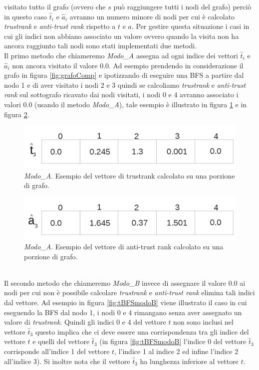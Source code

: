 visitato tutto il grafo (ovvero che \(s\) può raggiungere tutti i nodi del grafo) perciò in questo caso \(\hat{t}_i\) e \(\hat{a}_i\) avranno un numero minore di nodi per cui è calcolato \textit{trustrank} e \textit{anti-trust rank} rispetto a \(t\) e \(a\). Per gestire questa situazione i casi in cui gli indici non abbiano associato un valore ovvero quando la visita non ha ancora raggiunto tali nodi sono stati implementati due metodi.\\ 
Il primo metodo che chiameremo \textit{Modo\_A} assegna ad ogni indice dei vettori \(\hat{t}_i\) e \(\hat{a}_i\) non ancora visitato il valore 0.0. Ad esempio prendendo in considerazione il grafo in figura \ref{fig:grafoComp} e ipotizzando di eseguire una BFS a partire dal nodo 1 e di aver visitato i nodi 2 e 3 quindi se calcoliamo \textit{trustrank} e \textit{anti-trust rank} sul sottografo ricavato dai nodi visitati, i nodi 0 e 4 avranno associato i valori 0.0 (usando il metodo \textit{Modo\_A}), tale esempio è illustrato in figura \ref{fig:tBFSmodoA} e in figura \ref{fig:aBFSmodoA}.
\begin{figure}
\centering
 \includegraphics{immagini/test/tBFSmodoA}
 \caption{\textit{Modo\_A}. Esempio del vettore di trustrank calcolato su una porzione di grafo.}
 \label{fig:tBFSmodoA}
\end{figure}
\begin{figure}
\centering
 \includegraphics{immagini/test/aBFSmodoA}
 \caption{\textit{Modo\_A}. Esempio del vettore di anti-trust rank calcolato su una porzione di grafo.}
 \label{fig:aBFSmodoA}
\end{figure}
\\
Il secondo metodo che chiameremo \textit{Modo\_B} invece di assegnare il valore 0.0 ai nodi per cui non è possibile calcolare \textit{trustrank} e \textit{anti-trust rank} elimina tali indici dal vettore.  Ad esempio in figura \ref{fig:tBFSmodoB} viene illustrato il caso in cui eseguendo la BFS dal nodo 1, i nodi 0 e 4 rimangano senza aver assegnato un valore di \textit{trustrank}. Quindi gli indici 0 e 4 del vettore \(t\) non sono inclusi nel vettore \(\hat{t}_3\) questo implica che ci deve essere una corrispondenza tra gli indice del vettore \(t\) e quelli del vettore \(\hat{t}_3\) (in figura \ref{fig:tBFSmodoB} l'indice 0 del vettore \(\hat{t}_3\) corrisponde all'indice 1 del vettore \(t\), l'indice 1 al indice 2 ed infine l'indice 2 all'indice 3).  Si inoltre nota che il vettore \(\hat{t}_3\) ha lunghezza inferiore al vettore \(t\). 
